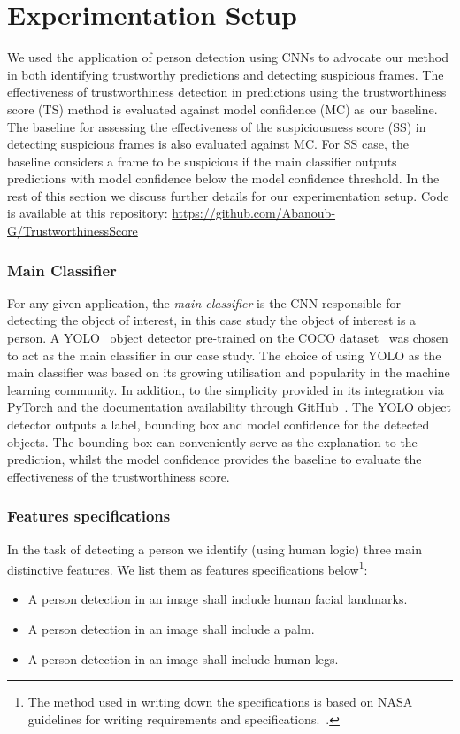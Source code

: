 \section{Experimentation Setup} \label{sec:experiment}
We used the application of person detection using CNNs to advocate our method in both identifying trustworthy predictions and detecting suspicious frames. 
%
The effectiveness of trustworthiness detection in predictions using the trustworthiness score (TS) method is evaluated against model confidence (MC) as our baseline. 
%
The baseline for assessing the effectiveness of the suspiciousness score (SS) in detecting suspicious frames is also evaluated against MC.
%
For SS case, the baseline considers a frame to be suspicious if the main classifier outputs predictions with model confidence below the model confidence threshold. 
%
In the rest of this section we discuss further details for our experimentation setup. Code is available at this repository: \url{https://github.com/Abanoub-G/TrustworthinessScore}

\subsubsection{Main Classifier}
For any given application, the \textit{main classifier} is the CNN responsible for detecting the object of interest, in this case study the object of interest is a person. 
%
A YOLO~\cite{Redmon2015} object detector pre-trained on the COCO dataset~\cite{COCO_dataset} was chosen to act as the main classifier in our case study. The choice of using YOLO as the main classifier was based on its growing utilisation and popularity in the machine learning community. In addition, to the simplicity provided in its integration via PyTorch and the documentation availability through GitHub~\cite{Jocher_YOLOv5_by_Ultralytics_2020}. 
%
The YOLO object detector outputs a label, bounding box and model confidence for the detected objects. The bounding box can conveniently serve as the explanation to the prediction, whilst the model confidence provides the baseline to evaluate the effectiveness of the trustworthiness score.

\subsubsection{Features specifications}
In the task of detecting a person we identify (using human logic) three main distinctive features. We list them as features specifications below\footnote{The method used in writing down the specifications is based on NASA guidelines for writing requirements and specifications.~\cite{NASA_SystemsEngineeringHandbook}.}:
\begin{itemize}
    \item A person detection in an image shall include human facial landmarks.
    \item A person detection in an image shall include a palm.
    \item A person detection in an image shall include human legs.
\end{itemize}

